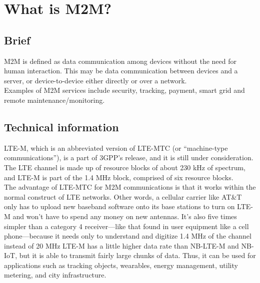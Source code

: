 \documentclass[12pt]{article}
\author{Artur Ziemba  \\
	Zachodniopomorski Uniwersytet Technologiczny w Szczecinie}
\date{\today}
\begin{document}
\maketitle
\pagebreak

\tableofcontents %

\pagebreak
\section{What is M2M?}
\subsection{Brief}
M2M is defined as data communication among devices without the need for human interaction. This may be data communication between devices and a server, or device-to-device either directly or over a network.\\
Examples of M2M services include security, tracking, payment, smart grid and remote maintenance/monitoring. 

\subsection{Technical information}
LTE-M, which is an abbreviated version of LTE-MTC (or “machine-type communications”), is a part of 3GPP’s release, and it is still under consideration.\\
The LTE channel is made up of resource blocks of about 230 kHz of spectrum, and LTE-M is part of the 1.4 MHz block, comprised of six resource blocks.\\
The advantage of LTE-MTC for M2M communications is that it works within the normal construct of LTE networks. Other words, a cellular carrier like AT\&T  only has to upload new baseband software onto its base stations to turn on LTE-M and won’t have to spend any money on new antennas. It’s also five times simpler than a category 4 receiver—like that found in user equipment like a cell phone—because it needs only to understand and digitize 1.4 MHz of the channel instead of 20 MHz
LTE-M has a little higher data rate than NB-LTE-M and NB-IoT, but it is able to transmit fairly large chunks of data. Thus, it can be used for applications such as tracking objects, wearables, energy management, utility metering, and city infrastructure. 
\end{document}
